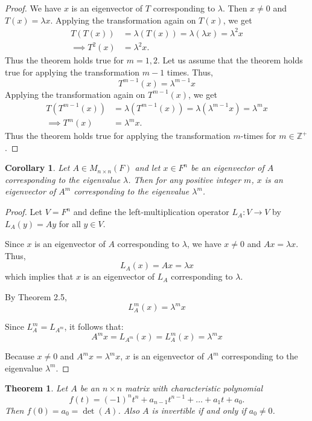 \documentclass[12pt, a4paper]{article}
\newtheorem{theorem}{Theorem}[section]
\newtheorem{corollary}{Corollary}[theorem]
\theoremstyle{definition}
\theoremstyle{remark}
\begin{document}
\begin{proof}
We have $x$ is an eigenvector of $T$ corresponding to $\lambda$. Then $x \neq 0$ and $T(x) = \lambda x$. Applying the transformation again on $T(x)$, we get
\begin{align*}
T(T(x)) &= \lambda(T(x)) = \lambda(\lambda x) = \lambda^2 x \\
\implies T^2(x) &= \lambda^2 x.
\end{align*}
Thus the theorem holds true for $m = 1, 2$. Let us assume that the theorem holds true for applying the transformation $m-1$ times. Thus,
\[
T^{m-1}(x) = \lambda^{m-1} x
\]
Applying the transformation again on $T^{m-1}(x)$, we get
\begin{align*}
T(T^{m-1}(x)) &= \lambda(T^{m-1}(x)) = \lambda(\lambda^{m-1} x) = \lambda^m x \\
\implies T^m(x) &= \lambda^m x.
\end{align*}
Thus the theorem holds true for applying the transformation $m$-times for $m \in \mathbb{Z}^+$.
\end{proof}

\begin{corollary}
    Let $A \in M_{n \times n}(F)$ and let $x \in F^n$ be an eigenvector of $A$ corresponding to the eigenvalue $\lambda$. Then for any positive integer $m$, $x$ is an eigenvector of $A^m$ corresponding to the eigenvalue $\lambda^m$.
\end{corollary}

\begin{proof}
    Let $V = F^n$ and define the left-multiplication operator $L_A : V \to V$ by $L_A(y) = Ay$ for all $y \in V$. 

Since $x$ is an eigenvector of $A$ corresponding to $\lambda$, we have $x \neq 0$ and $Ax = \lambda x$. Thus,
\[
L_A(x) = Ax = \lambda x
\]
which implies that $x$ is an eigenvector of $L_A$ corresponding to $\lambda$.

By Theorem 2.5,
\[
L_A^m(x) = \lambda^m x
\]

Since $L_A^m = L_{A^m}$, it follows that:
\[
A^m x = L_{A^m}(x) = L_A^m(x) = \lambda^m x
\]

Because $x \neq 0$ and $A^m x = \lambda^m x$, $x$ is an eigenvector of $A^m$ corresponding to the eigenvalue $\lambda^m$.
\end{proof}

\begin{theorem}
Let $A$ be an $n \times n$ matrix with characteristic polynomial
\[
f(t) = (-1)^n t^n + a_{n-1} t^{n-1} + \dots + a_1 t + a_0.
\]
Then $f(0) = a_0 = \det(A)$. Also $A$ is invertible if and only if $a_0 \neq 0$.
\end{theorem}
\end{document}

